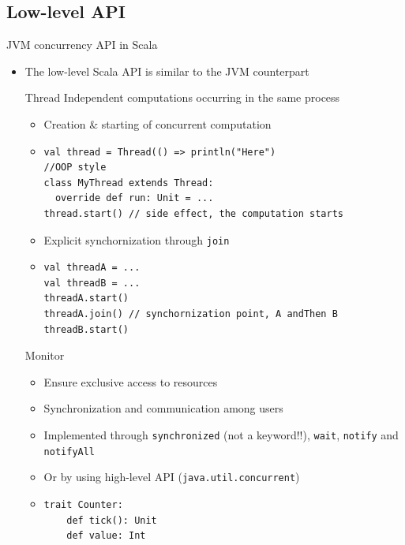 \documentclass[presentation, 9pt]{beamer}\mode<presentation>{\usetheme{AMSBolognaFC}}
\begin{document}
\subsection{Low-level API}
\begin{frame}{JVM concurrency API in Scala}
	\begin{itemize}
		\item The low-level Scala API is similar to the JVM counterpart
  	\begin{alertblock}{Thread}
			Independent computations occurring in the same process 
			\begin{itemize}
				\item Creation \& starting of concurrent computation
    		\item[] \begin{tcolorbox}[left=0pt, top=0pt, bottom=0pt]
					\begin{verbatim}
val thread = Thread(() => println("Here")
//OOP style
class MyThread extends Thread:
  override def run: Unit = ...
thread.start() // side effect, the computation starts
					\end{verbatim}
				\end{tcolorbox}

				\item Explicit synchornization through \texttt{join}
				\item[] \begin{tcolorbox}[left=0pt, top=0pt, bottom=0pt]
					\begin{verbatim}
val threadA = ...
val threadB = ...
threadA.start()
threadA.join() // synchornization point, A andThen B
threadB.start()
					\end{verbatim}
				\end{tcolorbox}
			\end{itemize}
		\end{alertblock}
		\begin{alertblock}{Monitor}
			\begin{itemize}
				\item Ensure exclusive access to resources 
				\item Synchronization and communication among users
    		\item Implemented through \texttt{synchronized} (not a keyword!!), \texttt{wait}, \texttt{notify} and \texttt{notifyAll}
      	\item Or by using high-level API (\texttt{java.util.concurrent})
    		\item[] \begin{tcolorbox}[left=0pt, top=0pt, bottom=0pt]
					\begin{verbatim}
trait Counter:
	def tick(): Unit
	def value: Int


\end{verbatim}
\end{tcolorbox}
\end{itemize}
\end{alertblock}
\end{itemize}
\end{frame}
\end{document}
